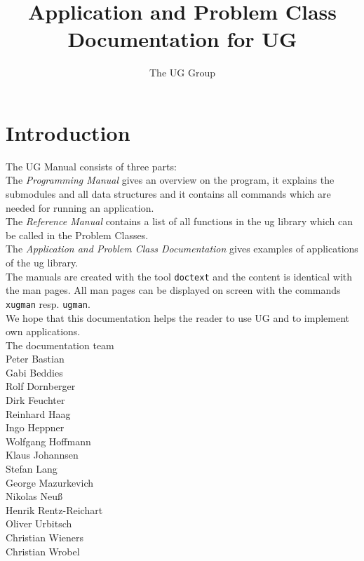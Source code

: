 


\pagestyle{myheadings}
\sloppy
\makeindex




\newcommand{\sectitle}{\mbox{}}
\setcounter{page}{0}

\title{Application and Problem Class Documentation for UG}
\author{The UG Group}

\maketitle


\section*{Introduction}

The UG Manual consists of three parts:
\\[5mm]  
The {\em Programming Manual} gives an overview on the program, it
explains the submodules and all data structures and it contains
all commands which are needed for running an application.
\\[5mm]  
The {\em Reference Manual} contains a list of all 
functions in the ug library which can be called in the Problem Classes.
\\[5mm]
The {\em Application and Problem Class Documentation} gives examples
of applications of the ug library.
\\[5mm]
The manuals are created with the tool {\tt doctext} and the content is 
identical with the man pages. All man pages can be displayed on screen 
with the commands {\tt xugman} resp. {\tt ugman}.
\\[5mm]
We hope that this documentation helps the reader to use UG 
and to implement own applications.
\\[1cm]
The documentation team
\\[1cm]
Peter Bastian\\
Gabi Beddies\\
Rolf Dornberger\\
Dirk Feuchter\\
Reinhard Haag\\
Ingo Heppner\\
Wolfgang Hoffmann\\
Klaus Johannsen\\
Stefan Lang\\
George Mazurkevich\\
Nikolas Neu\ss\\
Henrik Rentz-Reichart\\
Oliver Urbitsch\\
Christian Wieners\\
Christian Wrobel

